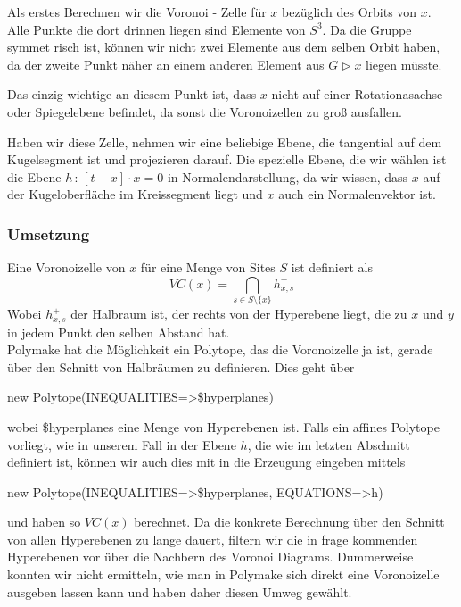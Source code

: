             Als erstes Berechnen wir die Voronoi - Zelle für $x$ bezüglich des Orbits von $x$. Alle Punkte die dort drinnen liegen sind Elemente von $S^3$. Da die Gruppe symmet          risch ist, können wir nicht zwei Elemente aus dem selben Orbit haben, da der zweite Punkt näher an einem anderen Element aus $G \rhd x$ liegen müsste.

         Das einzig wichtige an diesem Punkt ist, dass $x$ nicht auf einer Rotationasachse oder Spiegelebene befindet, da sonst die Voronoizellen zu groß ausfallen.

         Haben wir diese Zelle, nehmen wir eine beliebige Ebene, die tangential auf dem Kugelsegment ist und projezieren darauf. Die spezielle Ebene, die wir wählen
         ist die Ebene $h \, : \, [t - x] \cdot x = 0$ in Normalendarstellung, da wir wissen, dass $x$ auf der Kugeloberfläche im Kreissegment liegt und $x$ auch ein
          Normalenvektor ist.
            
        \subsubsection*{Umsetzung}
         Eine Voronoizelle von $x$ für eine Menge von Sites $S$ ist definiert als 
         $$ VC(x) = \bigcap_{s \in S \setminus \{ x \}} h^+_{x,s}$$
         Wobei $h^+_{x,s}$ der Halbraum ist, der rechts von der Hyperebene liegt, die zu $x$ und $y$ in jedem Punkt den selben Abstand hat.\\

         Polymake hat die Möglichkeit ein Polytope, das die Voronoizelle ja ist, gerade über den Schnitt von Halbräumen zu definieren. Dies geht über

         \begin{code}
            new Polytope(INEQUALITIES=>\$hyperplanes)
         \end{code}

         wobei \$hyperplanes eine Menge von Hyperebenen ist. Falls ein affines Polytope vorliegt, wie in unserem Fall in der Ebene $h$, die wie im letzten Abschnitt
         definiert ist, können wir auch dies mit in die Erzeugung eingeben mittels

         \begin{code}
            new Polytope(INEQUALITIES=>\$hyperplanes, EQUATIONS=>{h})
         \end{code}

         und haben so $VC(x)$ berechnet. Da die konkrete Berechnung über den Schnitt von allen Hyperebenen zu lange dauert, filtern wir die in frage kommenden Hyperebenen vor
         über die Nachbern des Voronoi Diagrams. Dummerweise konnten wir nicht ermitteln, wie man in Polymake sich direkt eine Voronoizelle ausgeben lassen kann und
         haben daher diesen Umweg gewählt.\\


